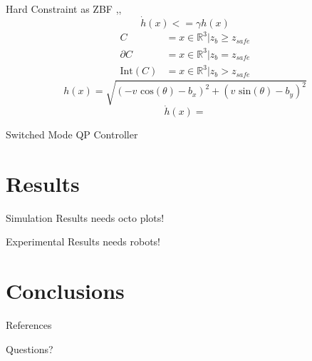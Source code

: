 \documentclass[10pt]{beamer}
\begin{document}
\begin{frame}{Hard Constraint as ZBF \cite{amesACC},\cite{ames2015robust},\cite{ames2014esclf}}
$$\dot{h}(x)<=\gamma h(x)$$\pause
\begin{align*}
C &= {x \in \mathbb{R}^3 | z_b\geq z_{safe}}\\
\partial C &= {x \in \mathbb{R}^3 | z_b=z_{safe}}\\
\text{Int}(C) &= {x \in \mathbb{R}^3 | z_b > z_{safe}}
\end{align*}\pause
$$h(x)=\sqrt{(-v\text{ cos}(\theta)-b_x)^2+(v\text{ sin}(\theta)-b_y)^2}$$\pause
$$\dot{h}(x)=$$

\end{frame}

\begin{frame}{Switched Mode QP Controller}

\end{frame}

\section{Results}
\begin{frame}{Simulation Results}
needs octo plots!
\end{frame}

\begin{frame}{Experimental Results}
needs robots!
\end{frame}

\section{Conclusions}
\begin{frame}{}

\end{frame}

\begin{frame}[allowframebreaks]{References}
\footnotesize


\end{frame}

\begin{frame}[standout]
Questions?
\end{frame}
\end{document}

